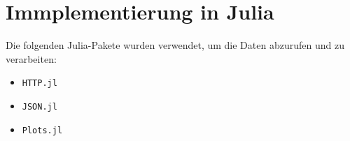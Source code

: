 \section{Immplementierung in Julia}
Die folgenden Julia-Pakete wurden verwendet, um die Daten abzurufen und zu verarbeiten:
\begin{itemize}
    \item \texttt{HTTP.jl}
    \item \texttt{JSON.jl}
    \item \texttt{Plots.jl}
\end{itemize}

\inputminted[frame=lines,
framesep=2mm,
baselinestretch=1.2,
bgcolor=LightGray,
fontsize=\footnotesize,
linenos]{Julia}{./code/Julia4.jl}